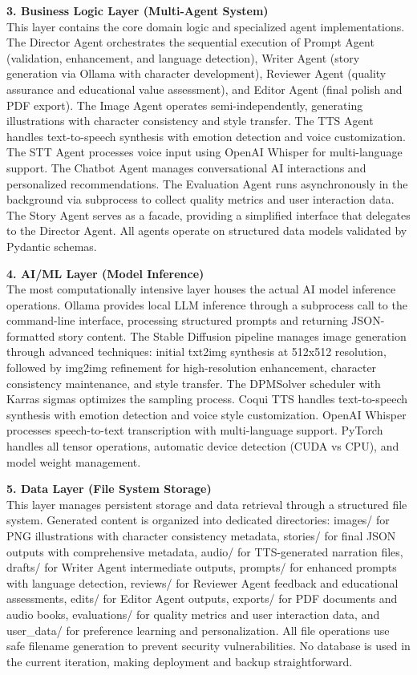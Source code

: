 \textbf{3. Business Logic Layer (Multi-Agent System)}\\
This layer contains the core domain logic and specialized agent implementations. The Director Agent orchestrates the sequential execution of Prompt Agent (validation, enhancement, and language detection), Writer Agent (story generation via Ollama with character development), Reviewer Agent (quality assurance and educational value assessment), and Editor Agent (final polish and PDF export). The Image Agent operates semi-independently, generating illustrations with character consistency and style transfer. The TTS Agent handles text-to-speech synthesis with emotion detection and voice customization. The STT Agent processes voice input using OpenAI Whisper for multi-language support. The Chatbot Agent manages conversational AI interactions and personalized recommendations. The Evaluation Agent runs asynchronously in the background via subprocess to collect quality metrics and user interaction data. The Story Agent serves as a facade, providing a simplified interface that delegates to the Director Agent. All agents operate on structured data models validated by Pydantic schemas.

\textbf{4. AI/ML Layer (Model Inference)}\\
The most computationally intensive layer houses the actual AI model inference operations. Ollama provides local LLM inference through a subprocess call to the command-line interface, processing structured prompts and returning JSON-formatted story content. The Stable Diffusion pipeline manages image generation through advanced techniques: initial txt2img synthesis at 512x512 resolution, followed by img2img refinement for high-resolution enhancement, character consistency maintenance, and style transfer. The DPMSolver scheduler with Karras sigmas optimizes the sampling process. Coqui TTS handles text-to-speech synthesis with emotion detection and voice style customization. OpenAI Whisper processes speech-to-text transcription with multi-language support. PyTorch handles all tensor operations, automatic device detection (CUDA vs CPU), and model weight management.

\textbf{5. Data Layer (File System Storage)}\\
This layer manages persistent storage and data retrieval through a structured file system. Generated content is organized into dedicated directories: images/ for PNG illustrations with character consistency metadata, stories/ for final JSON outputs with comprehensive metadata, audio/ for TTS-generated narration files, drafts/ for Writer Agent intermediate outputs, prompts/ for enhanced prompts with language detection, reviews/ for Reviewer Agent feedback and educational assessments, edits/ for Editor Agent outputs, exports/ for PDF documents and audio books, evaluations/ for quality metrics and user interaction data, and user_data/ for preference learning and personalization. All file operations use safe filename generation to prevent security vulnerabilities. No database is used in the current iteration, making deployment and backup straightforward.

